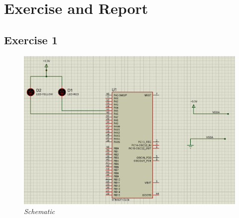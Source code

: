 

\section{Exercise and Report}
\subsection{Exercise 1}




\begin{figure}[!htp]
    \centering
    \includegraphics[width=5in]{source/picture/bai_1/pic1.jpg}
    \caption{\textit{Schematic}}
    \label{bai1_pic1}
\end{figure}



